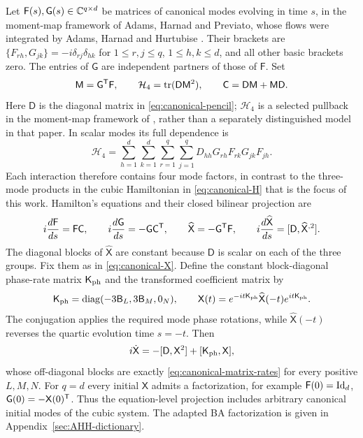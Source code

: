 Let $\mathsf F(s),\mathsf G(s)\in\mathbb C^{q\times d}$ be matrices of
canonical modes evolving in time $s$, in the moment-map framework
of Adams, Harnad and Previato, whose flows were integrated by Adams,
Harnad and Hurtubise
\cite{AdamsHarnadPreviato1988,AdamsHarnadHurtubise1990II}.
Their brackets are
$\{F_{rh},G_{jk}\}=-i\delta_{rj}\delta_{hk}$ for
$1\leq r,j\leq q$, $1\leq h,k\leq d$, and all other basic brackets
zero. The entries of $\mathsf G$ are independent partners of those
of $\mathsf F$. Set
\begin{equation}\label{eq:AHH-quartic-parent}
 \mathsf M=\mathsf G^{\mathsf T}\mathsf F,\qquad
 \mathcal H_4=\operatorname{tr}(\mathsf D\mathsf M^2),\qquad
 \mathsf C=\mathsf D\mathsf M+\mathsf M\mathsf D.
\end{equation}
Here $\mathsf D$ is the diagonal matrix in
\cref{eq:canonical-pencil}; $\mathcal H_4$ is a selected pullback in
the moment-map framework of \cite{AdamsHarnadPreviato1988}, rather
than a separately distinguished model in that paper.
In scalar modes its full dependence is
\begin{equation}\label{eq:AHH-quartic-components}
 \mathcal H_4=
 \sum_{h=1}^{d}\sum_{k=1}^{d}\sum_{r=1}^{q}\sum_{j=1}^{q}
 D_{hh}G_{rh}F_{rk}G_{jk}F_{jh}.
\end{equation}
Each interaction therefore contains four mode factors, in contrast to
the three-mode products in the cubic Hamiltonian in
\cref{eq:canonical-H} that is the focus of this work.
Hamilton's equations and their closed bilinear projection are
\begin{equation}\label{eq:AHH-parent-rates}
 i\frac{d\mathsf F}{ds}=\mathsf F\mathsf C,\qquad
 i\frac{d\mathsf G}{ds}=-\mathsf G\mathsf C^{\mathsf T},\qquad
 \widehat{\mathsf X}=-\mathsf G^{\mathsf T}\mathsf F,
 \qquad i\frac{d\widehat{\mathsf X}}{ds}
       =[\mathsf D,\widehat{\mathsf X}^{,2}].
\end{equation}
The diagonal blocks of $\widehat{\mathsf X}$ are constant because
$\mathsf D$ is scalar on each of the three groups. Fix them as in
\cref{eq:canonical-X}. Define the constant block-diagonal phase-rate
matrix $\mathsf K_{\rm ph}$ and the transformed coefficient matrix by
\begin{equation}\label{eq:AHH-time-phase-map}
 \mathsf K_{\rm ph}=\operatorname{diag}(-3\mathsf B_L,3\mathsf B_M,0_N),\qquad
 \mathsf X(t)=e^{-it\mathsf K_{\rm ph}}
       \widehat{\mathsf X}(-t)e^{it\mathsf K_{\rm ph}}.
\end{equation}
The conjugation applies the required mode phase rotations, while
$\widehat{\mathsf X}(-t)$ reverses the quartic evolution time $s=-t$.
Then
\begin{equation}\label{eq:AHH-cubic-projection}
 i\dot{\mathsf X}=-[\mathsf D,\mathsf X^2]
                         +[\mathsf K_{\rm ph},\mathsf X],
\end{equation}
whose off-diagonal blocks are exactly
\cref{eq:canonical-matrix-rates} for every positive $L,M,N$.
For $q=d$ every initial $\mathsf X$ admits a factorization, for example
$\mathsf F(0)=\mathrm{Id}_d$, $\mathsf G(0)=-\mathsf X(0)^{\mathsf T}$.
Thus the equation-level projection includes arbitrary canonical
initial modes of the cubic system. The adapted BA factorization is
given in Appendix~\ref{sec:AHH-dictionary}.

